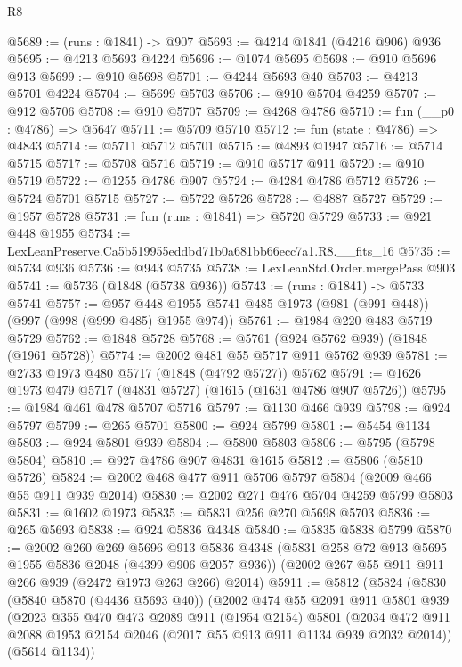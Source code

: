 \begin{lexlean}{R8}
\begin{coremodule}
@5689 := (runs : @1841) -> @907
@5693 := @4214 @1841 (@4216 @906) @936
@5695 := @4213 @5693 @4224
@5696 := @1074 @5695
@5698 := @910 @5696 @913
@5699 := @910 @5698
@5701 := @4244 @5693 @40
@5703 := @4213 @5701 @4224
@5704 := @5699 @5703
@5706 := @910 @5704 @4259
@5707 := @912 @5706
@5708 := @910 @5707
@5709 := @4268 @4786
@5710 := fun (__p0 : @4786) => @5647
@5711 := @5709 @5710
@5712 := fun (state : @4786) => @4843
@5714 := @5711 @5712 @5701
@5715 := @4893 @1947
@5716 := @5714 @5715
@5717 := @5708 @5716
@5719 := @910 @5717 @911
@5720 := @910 @5719
@5722 := @1255 @4786 @907
@5724 := @4284 @4786 @5712
@5726 := @5724 @5701 @5715
@5727 := @5722 @5726
@5728 := @4887 @5727
@5729 := @1957 @5728
@5731 := fun (runs : @1841) => @5720 @5729
@5733 := @921 @448 @1955
@5734 := LexLeanPreserve.Ca5b519955eddbd71b0a681bb66ecc7a1.R8.__fits_16
@5735 := @5734 @936
@5736 := @943 @5735
@5738 := LexLeanStd.Order.mergePass @903
@5741 := @5736 (@1848 (@5738 @936))
@5743 := (runs : @1841) -> @5733 @5741
@5757 := @957 @448 @1955 @5741 @485 @1973 (@981 (@991 @448)) (@997 (@998 (@999 @485) @1955 @974))
@5761 := @1984 @220 @483 @5719 @5729
@5762 := @1848 @5728
@5768 := @5761 (@924 @5762 @939) (@1848 (@1961 @5728))
@5774 := @2002 @481 @55 @5717 @911 @5762 @939
@5781 := @2733 @1973 @480 @5717 (@1848 (@4792 @5727)) @5762
@5791 := @1626 @1973 @479 @5717 (@4831 @5727) (@1615 (@1631 @4786 @907 @5726))
@5795 := @1984 @461 @478 @5707 @5716
@5797 := @1130 @466 @939
@5798 := @924 @5797
@5799 := @265 @5701
@5800 := @924 @5799
@5801 := @5454 @1134
@5803 := @924 @5801 @939
@5804 := @5800 @5803
@5806 := @5795 (@5798 @5804)
@5810 := @927 @4786 @907 @4831 @1615
@5812 := @5806 (@5810 @5726)
@5824 := @2002 @468 @477 @911 @5706 @5797 @5804 (@2009 @466 @55 @911 @939 @2014)
@5830 := @2002 @271 @476 @5704 @4259 @5799 @5803
@5831 := @1602 @1973
@5835 := @5831 @256 @270 @5698 @5703
@5836 := @265 @5693
@5838 := @924 @5836 @4348
@5840 := @5835 @5838 @5799
@5870 := @2002
    @260
    @269
    @5696
    @913
    @5836
    @4348
    (@5831 @258 @72 @913 @5695 @1955 @5836 @2048 (@4399 @906 @2057 @936))
    (@2002 @267 @55 @911 @911 @266 @939 (@2472 @1973 @263 @266) @2014)
@5911 := @5812
    (@5824
      (@5830
        (@5840 @5870 (@4436 @5693 @40))
        (@2002
          @474
          @55
          @2091
          @911
          @5801
          @939
          (@2023
            @355
            @470
            @473
            @2089
            @911
            (@1954 @2154)
            @5801
            (@2034 @472 @911 @2088 @1953 @2154 @2046 (@2017 @55 @913 @911 @1134 @939 @2032 @2014))
            (@5614 @1134))

\end{coremodule}
\end{lexlean}
